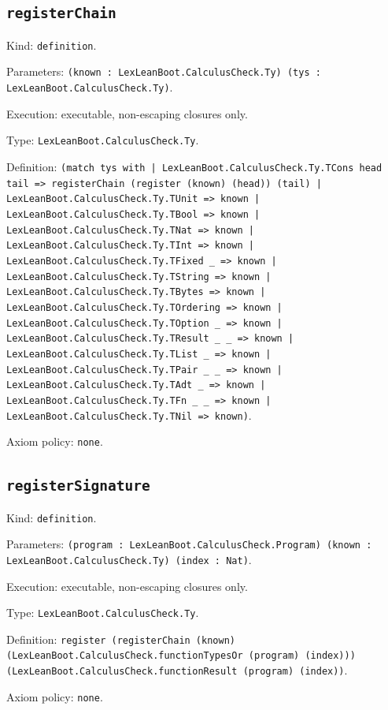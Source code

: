 \documentclass[11pt]{article}
\begin{document}
\subsection*{\texttt{registerChain}}
\noindent Kind: \texttt{definition}.\par
\noindent Parameters: \texttt{(known : LexLeanBoot.CalculusCheck.Ty) (tys : LexLeanBoot.CalculusCheck.Ty)}.\par
\noindent Execution: executable, non-escaping closures only.\par
\noindent Type: \texttt{LexLeanBoot.CalculusCheck.Ty}.\par
\noindent Definition: \texttt{(match tys with | LexLeanBoot.CalculusCheck.Ty.TCons head tail => registerChain (register (known) (head)) (tail) | LexLeanBoot.CalculusCheck.Ty.TUnit => known | LexLeanBoot.CalculusCheck.Ty.TBool => known | LexLeanBoot.CalculusCheck.Ty.TNat => known | LexLeanBoot.CalculusCheck.Ty.TInt => known | LexLeanBoot.CalculusCheck.Ty.TFixed \_ => known | LexLeanBoot.CalculusCheck.Ty.TString => known | LexLeanBoot.CalculusCheck.Ty.TBytes => known | LexLeanBoot.CalculusCheck.Ty.TOrdering => known | LexLeanBoot.CalculusCheck.Ty.TOption \_ => known | LexLeanBoot.CalculusCheck.Ty.TResult \_ \_ => known | LexLeanBoot.CalculusCheck.Ty.TList \_ => known | LexLeanBoot.CalculusCheck.Ty.TPair \_ \_ => known | LexLeanBoot.CalculusCheck.Ty.TAdt \_ => known | LexLeanBoot.CalculusCheck.Ty.TFn \_ \_ => known | LexLeanBoot.CalculusCheck.Ty.TNil => known)}.\par
\noindent Axiom policy: \texttt{none}.\par
\subsection*{\texttt{registerSignature}}
\noindent Kind: \texttt{definition}.\par
\noindent Parameters: \texttt{(program : LexLeanBoot.CalculusCheck.Program) (known : LexLeanBoot.CalculusCheck.Ty) (index : Nat)}.\par
\noindent Execution: executable, non-escaping closures only.\par
\noindent Type: \texttt{LexLeanBoot.CalculusCheck.Ty}.\par
\noindent Definition: \texttt{register (registerChain (known) (LexLeanBoot.CalculusCheck.functionTypesOr (program) (index))) (LexLeanBoot.CalculusCheck.functionResult (program) (index))}.\par
\noindent Axiom policy: \texttt{none}.\par
\end{document}
